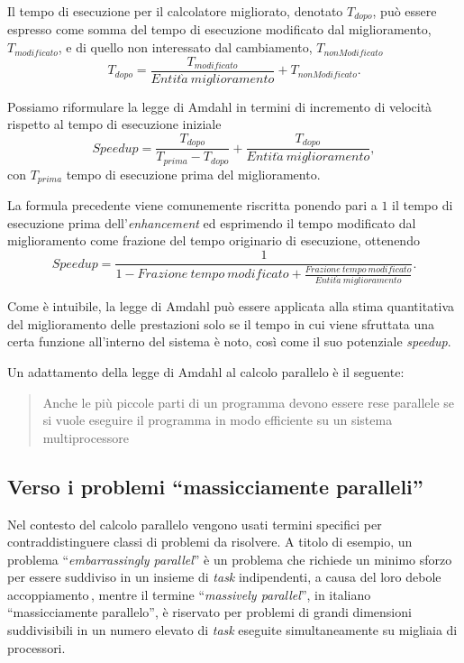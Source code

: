 Il tempo di esecuzione per il calcolatore migliorato, denotato $T_{dopo}$, pu\`o essere espresso come somma
del tempo di esecuzione modificato dal miglioramento, $T_{modificato}$, e di quello non interessato dal cambiamento,
$T_{nonModificato}$
\begin{equation} \label{eq:tDopo}
    T_{dopo}=\frac{T_{modificato}}{Entit\grave{a}~miglioramento} + T_{nonModificato}.
\end{equation}

Possiamo riformulare la legge di Amdahl in termini di incremento di velocit\`a rispetto al tempo di esecuzione iniziale
\begin{equation} \label{eq:speedup}
    \mathit{Speedup}=\frac{T_{dopo}}{T_{prima}-T_{dopo}}+\frac{T_{dopo}}{Entit\grave{a}~miglioramento},
\end{equation}
con $T_{prima}$ tempo di esecuzione prima del miglioramento.

La formula precedente viene comunemente riscritta ponendo pari a $1$ il tempo di esecuzione prima dell'\textit{enhancement} ed esprimendo
il tempo modificato dal miglioramento come frazione del tempo originario di esecuzione, ottenendo
\[
    \mathit{Speedup} = \frac{1}{1 - \mathit{Frazione~tempo~modificato} + \frac{\mathit{Frazione~tempo~modificato}}{\mathit{Entit\grave{a}~miglioramento}}}.
\]

Come \`e intuibile, la legge di Amdahl pu\`o essere applicata alla stima quantitativa del miglioramento delle
prestazioni solo se il tempo in cui viene sfruttata una certa funzione all'interno del sistema \`e noto, cos\`i come il
suo potenziale \textit{speedup}.

Un adattamento della legge di Amdahl al calcolo parallelo \`e il seguente:

\blockquote{Anche le pi\`u piccole parti di un programma devono essere rese parallele se si vuole eseguire il programma in modo efficiente su un sistema multiprocessore}.

\subsection{Verso i problemi \enquote{massicciamente paralleli}}
Nel contesto del calcolo parallelo vengono usati termini specifici per contraddistinguere classi di problemi da risolvere.\newline
A titolo di esempio, un problema \enquote{\textit{embarrassingly parallel}} \`e un problema che richiede un minimo sforzo per essere suddiviso in un insieme di
\textit{task} indipendenti, a causa del loro debole accoppiamento\,\cite{Herlihy2012}, mentre il termine \enquote{\textit{massively parallel}}, in italiano \enquote{massicciamente parallelo},
\`e riservato per problemi di grandi dimensioni suddivisibili in un numero elevato di \textit{task} eseguite simultaneamente su migliaia di processori.

